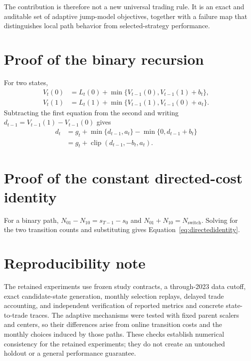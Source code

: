 \documentclass[11pt]{article}
\newcommand{\clip}{\operatorname{clip}}
\begin{document}
The contribution is therefore not a new universal trading rule. It is an exact and auditable set of adaptive jump-model objectives, together with a failure map that distinguishes local path behavior from selected-strategy performance.

\appendix

\section{Proof of the binary recursion}

For two states,
\begin{align}
V_t(0)&=L_t(0)+\min\{V_{t-1}(0),V_{t-1}(1)+b_t\},\\
V_t(1)&=L_t(1)+\min\{V_{t-1}(1),V_{t-1}(0)+a_t\}.
\end{align}
Subtracting the first equation from the second and writing $d_{t-1}=V_{t-1}(1)-V_{t-1}(0)$ gives
\begin{align}
d_t
&=g_t+\min\{d_{t-1},a_t\}-\min\{0,d_{t-1}+b_t\}\\
&=g_t+\clip(d_{t-1},-b_t,a_t).
\end{align}

\section{Proof of the constant directed-cost identity}

For a binary path, $N_{01}-N_{10}=s_{T-1}-s_0$ and $N_{01}+N_{10}=N_{\mathrm{switch}}$. Solving for the two transition counts and substituting gives Equation~\eqref{eq:directedidentity}.

\section{Reproducibility note}

The retained experiments use frozen study contracts, a through-2023 data cutoff, exact candidate-state generation, monthly selection replays, delayed trade accounting, and independent verification of reported metrics and concrete state-to-trade traces. The adaptive mechanisms were tested with fixed parent scalers and centers, so their differences arise from online transition costs and the monthly choices induced by those paths. These checks establish numerical consistency for the retained experiments; they do not create an untouched holdout or a general performance guarantee.
\end{document}
